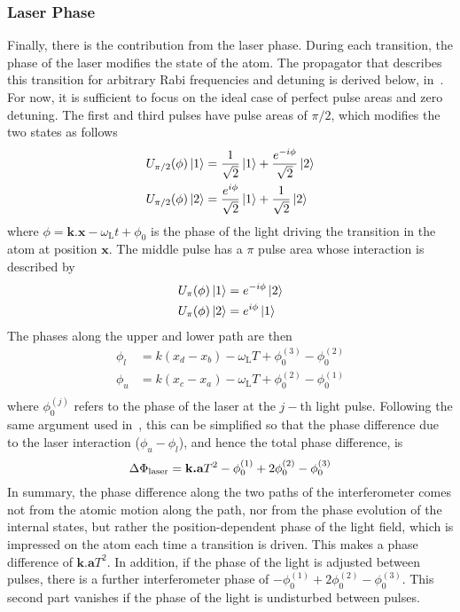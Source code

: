 \subsubsection{Laser Phase}
Finally, there is the contribution from the laser phase. During each
transition, the phase of the laser modifies the state of the atom. The
propagator that describes this transition for arbitrary Rabi
frequencies and detuning is derived below,
in~. For now, it is sufficient to focus
on the ideal case of perfect pulse areas and zero detuning. The first
and third pulses have pulse areas of $\pi/2$, which modifies the two
states as follows
\begin{subequations}
  \begin{align}
    U_{\pi/2}(\phi) \ket{1} &= \frac{1}{\sqrt{2}}\ket{1}+ 
    \frac{e^{-i \phi}}{\sqrt{2}} \ket{2} \\
    U_{\pi/2}(\phi) \ket{2} &=  \frac{e^{i \phi}}{\sqrt{2}} \ket{1}
    + \frac{1}{\sqrt{2}} \ket{2}
  \end{align}
\end{subequations}
where $\phi = \textbf{k.x} - \omega_\text{L}t + \phi_0$ is the phase
of the light driving the transition in the atom at position
$\textbf{x}$. The middle pulse has a $\pi$ pulse area whose interaction is
described by
\begin{subequations}
  \begin{align}
    U_\pi(\phi) \ket{1} &= e^{-i \phi} \ket{2} \\
    U_\pi(\phi) \ket{2} &= e^{i \phi} \ket{1} 
  \end{align}
\end{subequations}
The phases along the upper and lower path are then 
\begin{subequations}
  \begin{align}
    \phi_l &= k (x_d-x_b) - \omega_\text{L} T + \phi_{0}^{(3)} -\phi_{0}^{(2)}  \\
    \phi_u &= k (x_c-x_a) - \omega_\text{L} T + \phi_{0}^{(2)} -\phi_{0}^{(1)}  \\
  \end{align}
\end{subequations}
where $\phi_{0}^{(j)}$ refers to the phase of the laser at the $j-$th
light pulse. Following the same argument used in~, this
can be simplified so that the phase difference due to the laser interaction ($\phi_u -
\phi_l$), and hence the total phase difference, is
\begin{equation}
  \label{eq:phase_interferometer}
  \Delta \Phi_\textnormal{laser} = \textbf{k.a} T^2 - \phi_0^{(1)} + 2
  \phi_0^{(2)}
  - \phi_{0}^{(3)}
\end{equation}
In summary, the phase difference along the two paths of the
interferometer comes not from the atomic motion along the path, nor
from the phase evolution of the internal states, but rather the
position-dependent phase of the light field, which is impressed on the
atom each time a transition is driven. This makes a phase difference
of $\textbf{k.a} T^2$. In addition, if the phase of the light is
adjusted between pulses, there is a further interferometer phase of
$- \phi_0^{(1)} + 2\phi_0^{(2)} - \phi_0^{(3)}$. This second part
vanishes if the phase of the light is undisturbed between pulses.

